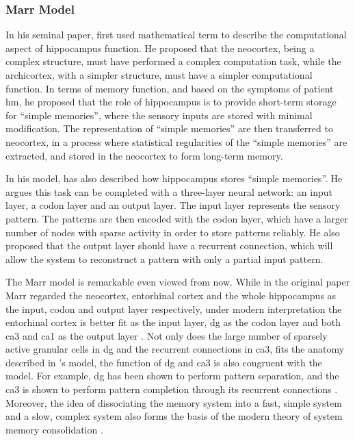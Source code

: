 \subsubsection{Marr Model \label{hpc-marr}}
In his seminal paper, \citet{marr71} first used mathematical term to describe the computational aspect of hippocampus function. He proposed that the neocortex, being a complex structure, must have performed a complex computation task, while the archicortex, with a simpler structure, must have a simpler computational function. In terms of memory function, and based on the symptoms of patient \gls{hm}, he proposed that the role of hippocampus is to provide short-term storage for ``simple memories'', where the sensory inputs are stored with minimal modification. The representation of ``simple memories'' are then transferred to neocortex, in a process where statistical regularities of the ``simple memories'' are extracted, and stored in the neocortex to form long-term memory. 

In his model, \citet{marr71} has also described how hippocampus stores ``simple memories''. He argues this task can be completed with a three-layer neural network: an input layer, a codon layer and an output layer. The input layer represents the sensory pattern. The patterns are then encoded with the codon layer, which have a larger number of nodes with sparse activity in order to store patterns reliably. He also proposed that the output layer should have a recurrent connection, which will allow the system to reconstruct a pattern with only a partial input pattern. 

The Marr model is remarkable even viewed from now. While in the original paper Marr \citep{marr71} regarded the neocortex, entorhinal cortex and the whole hippocampus as the input, codon and output layer respectively, under modern interpretation the entorhinal cortex is better fit as the input layer, \gls{dg} as the codon layer and both \gls{ca3} and \gls{ca1} as the output layer \citep{willshaw15}. Not only does the large number of sparsely active granular cells in \gls{dg} and the recurrent connections in \gls{ca3}, fits the anatomy described in \citet{marr71}'s model, the function of \gls{dg} and \gls{ca3} is also congruent with the model. For example, \gls{dg} has been shown to perform pattern separation, and the \gls{ca3} is shown to perform pattern completion through its recurrent connections \citep{knierim16}. Moreover, the idea of dissociating the memory system into a fast, simple system and a slow, complex system also forms the basis of the modern theory of system memory consolidation \citep{squire92, mcclelland13}. 

